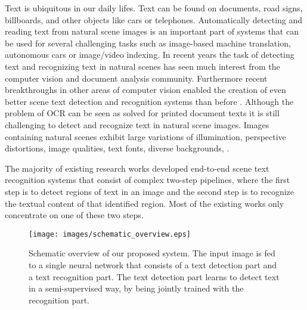 \documentclass[10pt,twocolumn,letterpaper]{article}
\begin{document}
Text is ubiquitous in our daily lifes.
Text can be found on documents, road signs, billboards, and other objects like cars or telephones.
Automatically detecting and reading text from natural scene images is an important part of systems that can be used for several challenging tasks such as image-based machine translation, autonomous cars or image/video indexing.
In recent years the task of detecting text and recognizing text in natural scenes has seen much interest from the computer vision and document analysis community.
Furthermore recent breakthroughs \cite{He2016Deep,Jaderberg2015Spatial,Redmon2016You,Ren2015Faster} in other areas of computer vision enabled the creation of even better scene text detection and recognition systems than before \cite{Bigorda2016Textproposalsa,Gupta2016Syntheticb,Shi2016Robust}.
Although the problem of \ac{OCR} can be seen as solved for printed document texts it is still challenging to detect and recognize text in natural scene images.
Images containing natural scenes exhibit large variations of illumination, perspective distortions, image qualities, text fonts, diverse backgrounds, \etc.

The majority of existing research works developed end-to-end scene text recognition systems that consist of complex two-step pipelines, where the first step is to detect regions of text in an image and the second step is to recognize the textual content of that identified region.
Most of the existing works only concentrate on one of these two steps.

\begin{figure}[t]
	\begin{center}
		\texttt{[image: images/schematic\_overview.eps]}
	\end{center}
	   \caption{Schematic overview of our proposed system. The input image is fed to a single neural network that consists of a text detection part and a text recognition part. The text detection part learns to detect text in a semi-supervised way, by being jointly trained with the recognition part.}
	\label{fig:schematic_of_system}
\end{figure}
\end{document}
